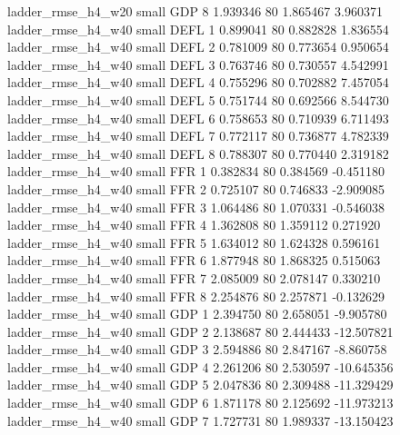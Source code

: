       ladder_rmse_h4_w20      small      GDP                 8 1.939346 80       1.865467           3.960371
      ladder_rmse_h4_w40      small     DEFL                 1 0.899041 80       0.882828           1.836554
      ladder_rmse_h4_w40      small     DEFL                 2 0.781009 80       0.773654           0.950654
      ladder_rmse_h4_w40      small     DEFL                 3 0.763746 80       0.730557           4.542991
      ladder_rmse_h4_w40      small     DEFL                 4 0.755296 80       0.702882           7.457054
      ladder_rmse_h4_w40      small     DEFL                 5 0.751744 80       0.692566           8.544730
      ladder_rmse_h4_w40      small     DEFL                 6 0.758653 80       0.710939           6.711493
      ladder_rmse_h4_w40      small     DEFL                 7 0.772117 80       0.736877           4.782339
      ladder_rmse_h4_w40      small     DEFL                 8 0.788307 80       0.770440           2.319182
      ladder_rmse_h4_w40      small      FFR                 1 0.382834 80       0.384569          -0.451180
      ladder_rmse_h4_w40      small      FFR                 2 0.725107 80       0.746833          -2.909085
      ladder_rmse_h4_w40      small      FFR                 3 1.064486 80       1.070331          -0.546038
      ladder_rmse_h4_w40      small      FFR                 4 1.362808 80       1.359112           0.271920
      ladder_rmse_h4_w40      small      FFR                 5 1.634012 80       1.624328           0.596161
      ladder_rmse_h4_w40      small      FFR                 6 1.877948 80       1.868325           0.515063
      ladder_rmse_h4_w40      small      FFR                 7 2.085009 80       2.078147           0.330210
      ladder_rmse_h4_w40      small      FFR                 8 2.254876 80       2.257871          -0.132629
      ladder_rmse_h4_w40      small      GDP                 1 2.394750 80       2.658051          -9.905780
      ladder_rmse_h4_w40      small      GDP                 2 2.138687 80       2.444433         -12.507821
      ladder_rmse_h4_w40      small      GDP                 3 2.594886 80       2.847167          -8.860758
      ladder_rmse_h4_w40      small      GDP                 4 2.261206 80       2.530597         -10.645356
      ladder_rmse_h4_w40      small      GDP                 5 2.047836 80       2.309488         -11.329429
      ladder_rmse_h4_w40      small      GDP                 6 1.871178 80       2.125692         -11.973213
      ladder_rmse_h4_w40      small      GDP                 7 1.727731 80       1.989337         -13.150423
